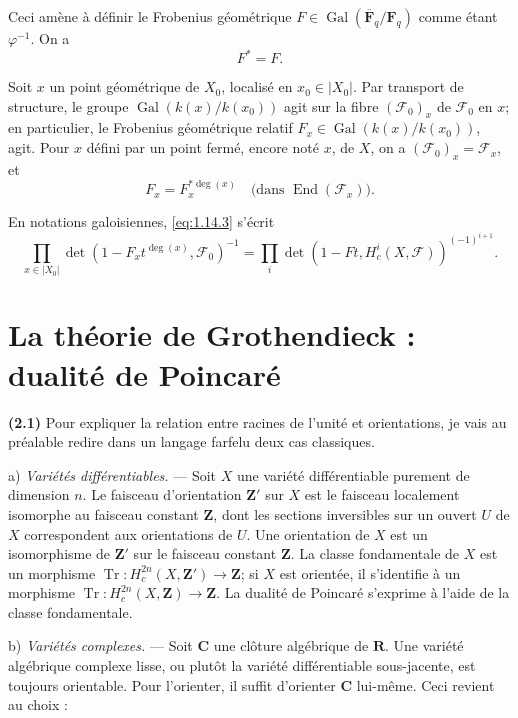 \documentclass[12pt,a4paper]{amsart}
\theoremstyle{plain}
\theoremstyle{definition}
\theoremstyle{remark}
\DeclareMathOperator{\Tr}{Tr}
\DeclareMathOperator{\Gal}{Gal}
\DeclareMathOperator{\End}{End}
\newcommand{\Z}{\mathbf{Z}}
\newcommand{\F}{\mathbf{F}}
\newcommand{\C}{\mathbf{C}}
\newcommand{\R}{\mathbf{R}}
\numberwithin{equation}{section}
\begin{document}
Ceci am\`ene \`a d\'efinir le Frobenius g\'eom\'etrique $F\in\Gal(\overline{\F}_q/\F_q)$ comme \'etant $\varphi^{-1}$. On a
\begin{equation}\label{eq:1.15.1}
F^* = F.
\end{equation}

Soit $x$ un point g\'eom\'etrique de $X_0$, localis\'e en $x_0\in|X_0|$. Par transport de structure, le groupe $\Gal(k(x)/k(x_0))$ agit sur la fibre $(\mathscr{F}_0)_x$ de $\mathscr{F}_0$ en $x$; en particulier, le Frobenius g\'eom\'etrique relatif $F_x\in\Gal(k(x)/k(x_0))$, agit. Pour $x$ d\'efini par un point ferm\'e, encore not\'e $x$, de $X$, on a $(\mathscr{F}_0)_x=\mathscr{F}_x$, et
\begin{equation}\label{eq:1.15.2}
F_x = F^{*\deg(x)}_x \quad\text{(dans $\End(\mathscr{F}_x)$).}
\end{equation}

En notations galoisiennes, \eqref{eq:1.14.3} s'\'ecrit
\[
\prod_{x\in|X_0|} \det(1-F_x t^{\deg(x)},\mathscr{F}_0)^{-1} = \prod_i \det(1-Ft, H^i_c(X,\mathscr{F}))^{(-1)^{i+1}}.
\]


\section{La th\'eorie de Grothendieck : dualit\'e de Poincar\'e}

\noindent \textbf{(2.1)} Pour expliquer la relation entre racines de l'unit\'e et orientations, je vais au pr\'ealable redire dans un langage farfelu deux cas classiques.

a) \textit{Vari\'et\'es diff\'erentiables.} --- Soit $X$ une vari\'et\'e diff\'erentiable purement de dimension $n$. Le faisceau d'orientation $\Z'$ sur $X$ est le faisceau localement isomorphe au faisceau constant $\Z$, dont les sections inversibles sur un ouvert $U$ de $X$ correspondent aux orientations de $U$. Une orientation de $X$ est un isomorphisme de $\Z'$ sur le faisceau constant $\Z$. La classe fondamentale de $X$ est un morphisme $\Tr:H^{2n}_c(X,\Z')\to\Z$; si $X$ est orient\'ee, il s'identifie \`a un morphisme $\Tr:H^{2n}_c(X,\Z)\to\Z$. La dualit\'e de Poincar\'e s'exprime \`a l'aide de la classe fondamentale.

b) \textit{Vari\'et\'es complexes.} --- Soit $\C$ une cl\^oture alg\'ebrique de $\R$. Une vari\'et\'e alg\'ebrique complexe lisse, ou plut\^ot la vari\'et\'e diff\'erentiable sous-jacente, est toujours orientable. Pour l'orienter, il suffit d'orienter $\C$ lui-m\^eme. Ceci revient au choix :
\end{document}
